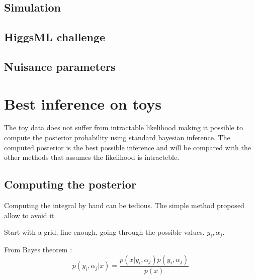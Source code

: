 \subsection{Simulation} %
\label{sub:simulation}




\subsection{HiggsML challenge} %
\label{sub:higgsml_challenge}




\subsection{Nuisance parameters} %
\label{sub:nuisance_parameters}






\section{Best inference on toys} %
\label{sec:best_inference_on_toys}

The toy data does not suffer from intractable likelihood making it possible to compute the posterior probability using standard bayesian inference.
The computed posterior is the best possible inference and will be compared with the other methods that assumes the likelihood is intracteble.

\subsection{Computing the posterior} %
\label{sub:computing_the_posterior}

Computing the integral by hand can be tedious.
The simple method proposed allow to avoid it.

Start with a grid, fine enough, going through the possible values. $y_i, \alpha_j$.

From Bayes theorem : 
$$
    p(y_i, \alpha_j | x) = \frac{p(x|y_i, \alpha_j) p(y_i, \alpha_j)}{p(x)}
$$

